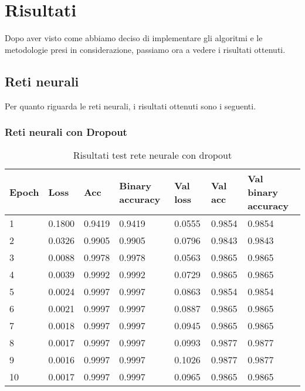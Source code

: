 \section{Risultati}
Dopo aver visto come abbiamo deciso di implementare gli algoritmi e le metodologie presi in considerazione, passiamo ora a vedere i risultati ottenuti.
\subsection{Reti neurali}
Per quanto riguarda le reti neurali, i risultati ottenuti sono i seguenti.
\subsubsection{Reti neurali con Dropout}
\renewcommand{\arraystretch}{1.4}
\begin{table}[H]
	\begin{center}
		\begin{tabular}{|p{1.2cm}|p{1.2cm}|p{1.2cm}|p{2cm}|p{1.2cm}|p{1.2cm}|p{2.5cm}|}
			\hline
				\textbf{Epoch} & \textbf{Loss}    & \textbf{Acc} & \textbf{Binary accuracy} & \textbf{Val loss} & \textbf{Val acc} & \textbf{Val binary accuracy}\\ \hline
				1 & 0.1800 & 0.9419 & 0.9419 & 0.0555 & 0.9854 & 0.9854 \\ \hline
				2 & 0.0326 & 0.9905 & 0.9905 & 0.0796 & 0.9843 & 0.9843 \\ \hline
				3 & 0.0088 & 0.9978 & 0.9978 & 0.0563 & 0.9865 & 0.9865 \\ \hline
				4 & 0.0039 & 0.9992 & 0.9992 & 0.0729 & 0.9865 & 0.9865 \\ \hline
				5 & 0.0024 & 0.9997 & 0.9997 & 0.0863 & 0.9854 & 0.9854 \\ \hline
				6 & 0.0021 & 0.9997 & 0.9997 & 0.0887 & 0.9865 & 0.9865 \\ \hline
				7 & 0.0018 & 0.9997 & 0.9997 & 0.0945 & 0.9865 & 0.9865 \\ \hline
				8 & 0.0017 & 0.9997 & 0.9997 & 0.0993 & 0.9877 & 0.9877 \\ \hline
				9 & 0.0016 & 0.9997 & 0.9997 & 0.1026 & 0.9877 & 0.9877 \\ \hline
				10 & 0.0017 & 0.9997 & 0.9997 & 0.0965 & 0.9865 & 0.9865 \\ \hline
		\end{tabular}
		\caption{Risultati test rete neurale con dropout\label{}}
	\end{center}
\end{table}
\renewcommand{\arraystretch}{1}
